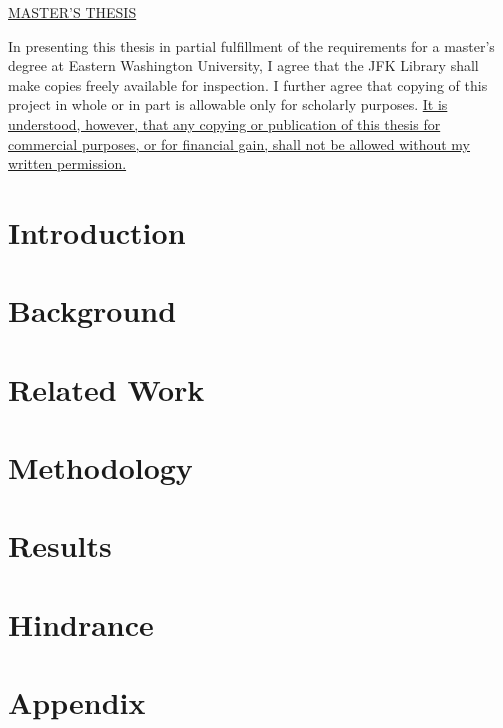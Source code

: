 \documentclass[chapterprefix=false, 12pt]{scrreprt}
\begin{document}
\newpage
\vspace*{1.5in}
\begin{center}
\underline{MASTER'S THESIS}\\
\end{center}
\begin{justify}
In presenting this thesis in partial fulfillment of the requirements for a master’s degree
at Eastern Washington University, I agree that the JFK Library shall make copies freely
available for inspection. I further agree that copying of this project in whole or in part
is allowable only for scholarly purposes. \ul{It is understood, however, that any copying or publication of this thesis for commercial purposes, or for financial gain, shall not be allowed without my written permission.}
\end{justify}
\begin{center}
\end{center}
\singlespace



\newpage


\tableofcontents
\listoffigures
\listoftables
\newpage



\chapter{Introduction}


\chapter{Background}


\chapter{Related Work}


\chapter{Methodology}



\chapter{Results}


\chapter{Hindrance}


\appendix
\chapter{Appendix}



\end{document}
